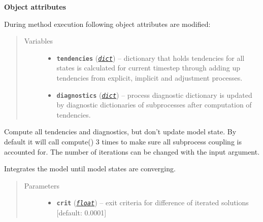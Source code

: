 \documentclass[a4paper,10pt,english]{sphinxmanual}
\begin{document}
\begin{fulllineitems}
\begin{fulllineitems}
\textbf{Object attributes}

During method execution following object attributes are modified:
\begin{quote}\begin{description}
\item[{Variables}] \leavevmode\begin{itemize}
\item {} 
\textbf{\texttt{tendencies}} (\href{http://docs.python.org/2.7/library/stdtypes.html\#dict}{\emph{\texttt{dict}}}) -- dictionary that holds tendencies for all states
is calculated for current timestep through 
adding up tendencies from explicit, implicit and
adjustment processes.

\item {} 
\textbf{\texttt{diagnostics}} (\href{http://docs.python.org/2.7/library/stdtypes.html\#dict}{\emph{\texttt{dict}}}) -- process diagnostic dictionary is updated 
by diagnostic dictionaries of subprocesses 
after computation of tendencies.

\end{itemize}

\end{description}\end{quote}

\end{fulllineitems}


\begin{fulllineitems}
\label{api/climlab.process:climlab.process.time_dependent_process.TimeDependentProcess.compute_diagnostics}
Compute all tendencies and diagnostics, but don't update model state.
By default it will call compute() 3 times to make sure all
subprocess coupling is accounted for. The number of iterations can
be changed with the input argument.

\end{fulllineitems}


\begin{fulllineitems}
\label{api/climlab.process:climlab.process.time_dependent_process.TimeDependentProcess.integrate_converge}
Integrates the model until model states are converging.
\begin{quote}\begin{description}
\item[{Parameters}] \leavevmode\begin{itemize}
\item {} 
\textbf{\texttt{crit}} (\href{http://docs.python.org/2.7/library/functions.html\#float}{\emph{\texttt{float}}}) -- exit criteria for difference of iterated
solutions {[}default: 0.0001{]}


\end{itemize}
\end{description}
\end{quote}
\end{fulllineitems}
\end{fulllineitems}
\end{document}
